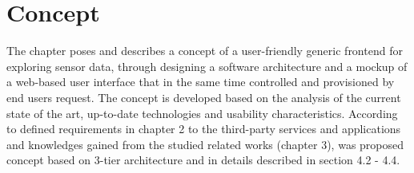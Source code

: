 \chapter{Concept}
     The chapter poses and describes a concept of a user-friendly generic frontend for exploring sensor data, 
     through designing a software architecture and a mockup of a web-based user interface that in the same time controlled and provisioned by end users request. The concept is developed based on the analysis of the current state of the art, up-to-date technologies and usability characteristics. According to defined requirements in chapter 2 to the third-party services and applications and knowledges gained from the studied related works (chapter 3), was proposed concept based on 3-tier architecture and in details described in section 4.2 - 4.4.

